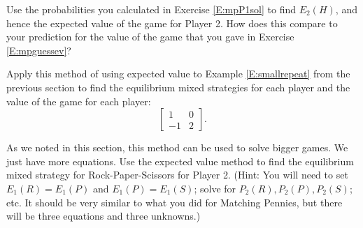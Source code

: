 \begin{xca}\label{E:mpEVP2}
Use the probabilities you calculated  in Exercise \ref{E:mpP1sol} to find $E_2(H)$, and hence the expected value of the game for Player 2. How does this compare to your prediction for the value of the game that you gave in Exercise \ref{E:mpguessev}?
\end{xca}

\begin{xca}\label{E:smallrepeatEV}
Apply this method of using expected value to Example \ref{E:smallrepeat} from the previous section to find the equilibrium mixed strategies  for each player and the value of the game for each player:
\[\left[\begin{matrix}
1&0\\
-1&2
\end{matrix}\right].
\]
\end{xca}
 
\begin{xca}\label{E:RPSEVsol}
As we noted in this section, this method can be used to solve bigger games. We just have more equations. Use the expected value method to find the equilibrium mixed strategy for Rock-Paper-Scissors for Player 2. (Hint: You will need to set $E_1(R)=E_1(P)$ and $E_1(P)=E_1(S)$; solve for $P_2(R), P_2(P), P_2(S)$; etc. It should be very similar to what you did for Matching Pennies, but there will be three equations and three unknowns.)

\end{xca}





 